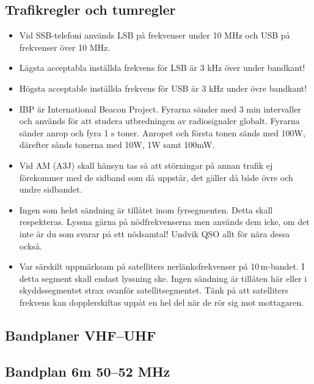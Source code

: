 \subsection{Trafikregler och tumregler}

\begin{itemize}
\item Vid SSB-telefoni används LSB på frekvenser under 10 MHz och USB
      på frekvenser över 10 MHz.
\item Lägsta acceptabla inställda frekvens för LSB är 3 kHz över
      under bandkant!
\item Högsta acceptable inställda frekvens för USB är 3 kHz under
      övre bandkant!
\item IBP är International Beacon Project. Fyrarna sänder med 3 min
      intervaller och används för att studera utbredningen av
      radiosignaler globalt. Fyrarna sänder anrop och fyra 1 s toner.
      Anropet och första tonen sänds med 100W, därefter sänds tonerna
      med 10W, 1W samt 100mW.
\item Vid AM (A3J) skall hänsyn tas så att störningar på annan trafik ej fö\-re\-kom\-mer
      med de sidband som då uppstår, det gäller då både övre och undre
      sidbandet.
\item Ingen som helst sändning är tillåtet inom fyrsegmenten. Detta skall respekteras.
      Lyssna gärna på nödfrekvenserna men används dem icke, om det
      inte är du som svarar på ett nödsamtal! Undvik QSO allt för nära
      dessa också.
\item Var särskilt uppmärksam på satelliters nerlänksfrekvenser på 10\,m-bandet.
      I detta segment skall endast lyssning ske. Ingen sändning är
      tillåten här eller i skyddssegmentet strax ovanför
      satellitsegmentet. Tänk på att satelliters frekvens kan
      dopplerskiftas uppåt en hel del när de rör sig mot mottagaren.
\end{itemize}

\scriptsize

\subsection{Bandplaner VHF--UHF}

\subsection{Bandplan 6m 50--52 MHz}

